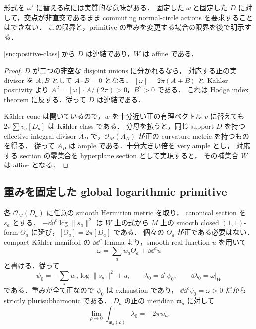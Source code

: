 形式を $\omega'$ に替える点には実質的な意味がある．
固定した $\omega$ と固定した $D$ に対して，交点が非直交であるまま
commuting normal-circle actions を要求することはできない．
この限界と，primitive の重みを変更する場合の限界を後で明示する．

\begin{lemma}
\label{snc:affine}
\eqref{snc:positive-class} から $D$ は連結であり，$W$ は affine である．
\end{lemma}
\begin{proof}
$D$ が二つの非空な disjoint unions に分かれるなら，
対応する正の実 divisor を $A,B$ として $A\cdot B=0$ となる．
$[\omega]=2\pi(A+B)$ と Kähler positivity より
$A^2=[\omega]\cdot A/(2\pi)>0$，$B^2>0$ である．
これは Hodge index theorem に反する．従って $D$ は連結である．

Kähler cone は開いているので，$w$ を十分近い正の有理ベクトル $v$ に替えても
$2\pi\sum v_a[D_a]$ は Kähler class である．
分母を払うと，同じ support $D$ を持つ effective integral divisor
$A_D$ で，$\mathcal O_M(A_D)$ が正の curvature metric を持つものを得る．
従って $A_D$ は ample である．十分大きい倍を very ample とし，
対応する section の零集合を hyperplane section として実現すると，
その補集合 $W$ は affine となる．
\end{proof}

\subsection{重みを固定した global logarithmic primitive}

各 $\mathcal O_M(D_a)$ に任意の smooth Hermitian metric を取り，
canonical section を $s_a$ とする．
$-\dd\dd^c\log\|s_a\|^2$ は $W$ 上の式から $M$ 上の smooth closed
$(1,1)$-form $\Theta_a$ に延び，$[\Theta_a]=2\pi[D_a]$ である．
個々の $\Theta_a$ が正である必要はない．
compact Kähler manifold の $\dd\dd^c$-lemma より，smooth real function $u$ を用いて
\[
 \omega=\sum_a w_a\Theta_a+\dd\dd^c u
\]
と書ける\cite[Lemma (5.11), pp.~266--267; Remark (5.14)]{DGMS}．従って
\begin{equation}\label{snc:log-potential}
 \psi_0=-\sum_a w_a\log\|s_a\|^2+u,\qquad
 \lambda_0=\dd^c\psi_0,\qquad
 \dd\lambda_0=\omega|_W
\end{equation}
である．重みが全て正なので $\psi_0$ は exhaustion であり，
$\dd\dd^c\psi_0=\omega>0$ だから strictly plurisubharmonic である．
$D_a$ の正の meridian $\mathfrak m_a$ に対して
\begin{equation}\label{snc:residues}
 \lim_{\rho\to0}\int_{\mathfrak m_a(\rho)}\lambda_0=-2\pi w_a.
\end{equation}

